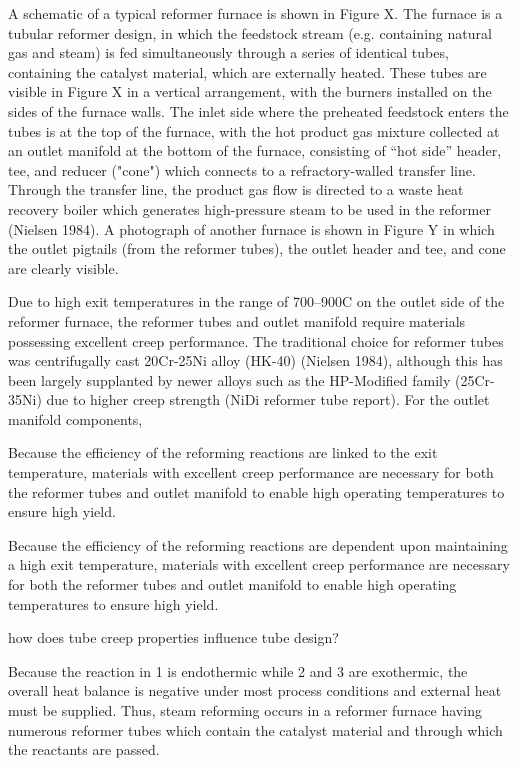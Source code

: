 A schematic of a typical reformer furnace is shown in Figure X. The furnace is a tubular reformer design, in which the feedstock stream (e.g. containing natural gas and steam) is fed simultaneously through a series of identical tubes, containing the catalyst material, which are externally heated. These tubes are visible in Figure X in a vertical arrangement, with the burners installed on the sides of the furnace walls. The inlet side where the preheated feedstock enters the tubes is at the top of the furnace, with the hot product gas mixture collected at an outlet manifold at the bottom of the furnace, consisting of ``hot side'' header, tee, and reducer ("cone") which connects to a refractory-walled transfer line. Through the transfer line, the product gas flow is directed to a waste heat recovery boiler which generates high-pressure steam to be used in the reformer (Nielsen 1984). A photograph of another furnace is shown in Figure Y in which the outlet pigtails (from the reformer tubes), the outlet header and tee, and cone are clearly visible.

Due to high exit temperatures in the range of 700--900C on the outlet side of the reformer furnace, the reformer tubes and outlet manifold require materials possessing excellent creep performance. The traditional choice for reformer tubes was centrifugally cast 20Cr-25Ni alloy (HK-40) (Nielsen 1984), although this has been largely supplanted by newer alloys such as the HP-Modified family (25Cr-35Ni) due to higher creep strength (NiDi reformer tube report). For the outlet manifold components, 








Because the efficiency of the reforming reactions are linked to the exit temperature, materials with excellent creep performance are necessary for both the reformer tubes and outlet manifold to enable high operating temperatures to ensure high yield.


Because the efficiency of the reforming reactions are dependent upon maintaining a high exit temperature, materials with excellent creep performance are necessary for both the reformer tubes and outlet manifold to enable high operating temperatures to ensure high yield.


how does tube creep properties influence tube design?




Because the reaction in 1 is endothermic while 2 and 3 are exothermic, the overall heat balance is negative under most process conditions and external heat must be supplied. Thus, steam reforming occurs in a reformer furnace having numerous reformer tubes which contain the catalyst material and through which the reactants are passed. 


